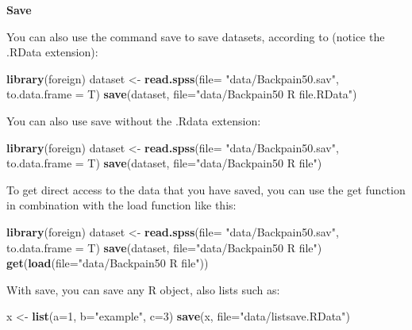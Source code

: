 \documentclass[
]{book}
\newenvironment{Shaded}{\begin{snugshade}}{\end{snugshade}}
\newcommand{\DataTypeTok}[1]{\textcolor[rgb]{0.13,0.29,0.53}{#1}}
\newcommand{\DecValTok}[1]{\textcolor[rgb]{0.00,0.00,0.81}{#1}}
\newcommand{\KeywordTok}[1]{\textcolor[rgb]{0.13,0.29,0.53}{\textbf{#1}}}
\newcommand{\NormalTok}[1]{#1}
\newcommand{\StringTok}[1]{\textcolor[rgb]{0.31,0.60,0.02}{#1}}
\begin{document}
\textbf{Save}

You can also use the command save to save datasets, according to (notice
the .RData extension):

\begin{Shaded}
\begin{Highlighting}[]
\KeywordTok{library}\NormalTok{(foreign)}
\NormalTok{dataset <-}\StringTok{ }\KeywordTok{read.spss}\NormalTok{(}\DataTypeTok{file=} \StringTok{"data/Backpain50.sav"}\NormalTok{, }\DataTypeTok{to.data.frame =}\NormalTok{ T)}
\KeywordTok{save}\NormalTok{(dataset, }\DataTypeTok{file=}\StringTok{"data/Backpain50 R file.RData"}\NormalTok{)}
\end{Highlighting}
\end{Shaded}

You can also use save without the .Rdata extension:

\begin{Shaded}
\begin{Highlighting}[]
\KeywordTok{library}\NormalTok{(foreign)}
\NormalTok{dataset <-}\StringTok{ }\KeywordTok{read.spss}\NormalTok{(}\DataTypeTok{file=} \StringTok{"data/Backpain50.sav"}\NormalTok{, }\DataTypeTok{to.data.frame =}\NormalTok{ T)}
\KeywordTok{save}\NormalTok{(dataset, }\DataTypeTok{file=}\StringTok{"data/Backpain50 R file"}\NormalTok{)}
\end{Highlighting}
\end{Shaded}

To get direct access to the data that you have saved, you can use the
get function in combination with the load function like this:

\begin{Shaded}
\begin{Highlighting}[]
\KeywordTok{library}\NormalTok{(foreign)}
\NormalTok{dataset <-}\StringTok{ }\KeywordTok{read.spss}\NormalTok{(}\DataTypeTok{file=} \StringTok{"data/Backpain50.sav"}\NormalTok{, }\DataTypeTok{to.data.frame =}\NormalTok{ T)}
\KeywordTok{save}\NormalTok{(dataset, }\DataTypeTok{file=}\StringTok{"data/Backpain50 R file"}\NormalTok{)}
\KeywordTok{get}\NormalTok{(}\KeywordTok{load}\NormalTok{(}\DataTypeTok{file=}\StringTok{"data/Backpain50 R file"}\NormalTok{))}
\end{Highlighting}
\end{Shaded}

With save, you can save any R object, also lists such as:

\begin{Shaded}
\begin{Highlighting}[]
\NormalTok{x <-}\StringTok{ }\KeywordTok{list}\NormalTok{(}\DataTypeTok{a=}\DecValTok{1}\NormalTok{, }\DataTypeTok{b=}\StringTok{"example"}\NormalTok{, }\DataTypeTok{c=}\DecValTok{3}\NormalTok{)}
\KeywordTok{save}\NormalTok{(x, }\DataTypeTok{file=}\StringTok{"data/listsave.RData"}\NormalTok{)}
\end{Highlighting}
\end{Shaded}
\end{document}
